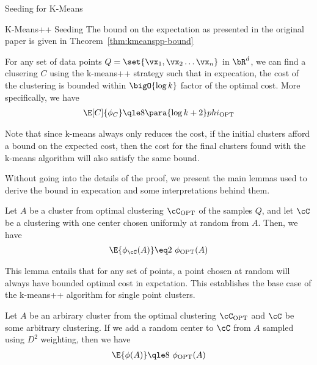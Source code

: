 \documentclass[10pt]{article}
\newcommand{\opt}[1]{#1_{\text{OPT}}}
\begin{document}
\begin{psection}{Seeding for K-Means}
\begin{psubsection}{K-Means++ Seeding}
        The bound on the expectation as presented in the original paper is given in
        Theorem~\ref{thm:kmeanspp-bound}
    
        \begin{theorem}\label{thm:kmeanspp-bound}
            For any set of data points $Q = \set{\vx_1, \vx_2 \dots \vx_n}$ in $\bR^d$,
            we can find a clusering $C$ using the k-means++ strategy such that in
            expecation, the cost of the clustering is bounded within $\bigO{\log k}$
            factor of the optimal cost. More specifically, we have
            \begin{align*}
                \E[C]{\phi_C} \qle 8 \para{\log k + 2} \opt{phi}
            \end{align*}
        \end{theorem}
    
        Note that since k-means always only reduces the cost, if the initial clusters
        afford a bound on the expected cost, then the cost for the final clusters found
        with the k-means algorithm will also satisfy the same bound.
    
        Without going into the details of the proof, we present the main lemmas used to
        derive the bound in expecation and some interpretations behind them.
    
        \begin{lemma}
            Let $A$ be a cluster from optimal clustering $\opt{\cC}$ of the samples $Q$,
            and let $\cC$ be a clustering with one center chosen uniformly at random
            from $A$. Then, we have
            \begin{align*}
                \E{\phi_\cC(A)} \eq 2\ \opt{\phi}(A)
            \end{align*}
        \end{lemma}
    
        This lemma entails that for any set of points, a point chosen at random will
        always have bounded optimal cost in expctation. This establishes the base case
        of the k-means++ algorithm for single point clusters.
    
        \begin{lemma}
            Let $A$ be an arbirary cluster from the optimal clustering $\opt{\cC}$ and
            $\cC$ be some arbitrary clustering. If we add a random center to $\cC$ from
            $A$ sampled using $D^2$ weighting, then we have
            \begin{align*}
                \E{\phi(A)} \qle 8\ \opt{\phi}(A)
            \end{align*}
        \end{lemma}
    

\end{psubsection}
\end{psection}
\end{document}
